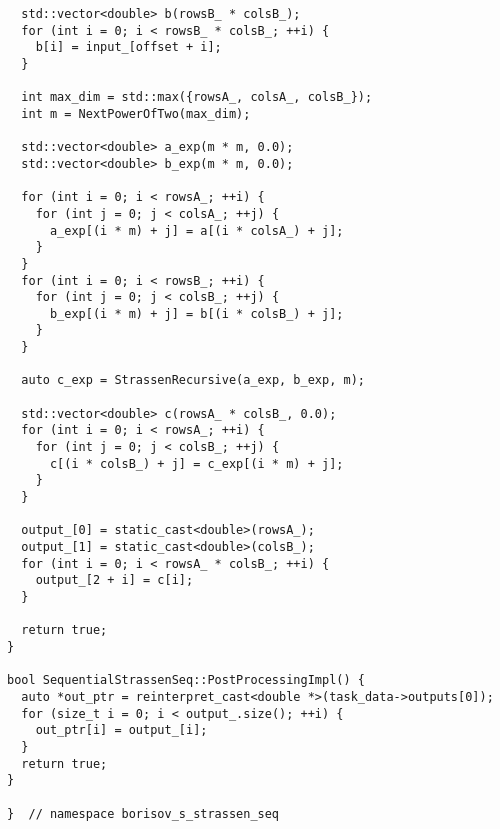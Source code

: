\documentclass[12pt]{article}
\begin{document}
\begin{lstlisting}
  std::vector<double> b(rowsB_ * colsB_);
  for (int i = 0; i < rowsB_ * colsB_; ++i) {
    b[i] = input_[offset + i];
  }

  int max_dim = std::max({rowsA_, colsA_, colsB_});
  int m = NextPowerOfTwo(max_dim);

  std::vector<double> a_exp(m * m, 0.0);
  std::vector<double> b_exp(m * m, 0.0);

  for (int i = 0; i < rowsA_; ++i) {
    for (int j = 0; j < colsA_; ++j) {
      a_exp[(i * m) + j] = a[(i * colsA_) + j];
    }
  }
  for (int i = 0; i < rowsB_; ++i) {
    for (int j = 0; j < colsB_; ++j) {
      b_exp[(i * m) + j] = b[(i * colsB_) + j];
    }
  }

  auto c_exp = StrassenRecursive(a_exp, b_exp, m);

  std::vector<double> c(rowsA_ * colsB_, 0.0);
  for (int i = 0; i < rowsA_; ++i) {
    for (int j = 0; j < colsB_; ++j) {
      c[(i * colsB_) + j] = c_exp[(i * m) + j];
    }
  }

  output_[0] = static_cast<double>(rowsA_);
  output_[1] = static_cast<double>(colsB_);
  for (int i = 0; i < rowsA_ * colsB_; ++i) {
    output_[2 + i] = c[i];
  }

  return true;
}

bool SequentialStrassenSeq::PostProcessingImpl() {
  auto *out_ptr = reinterpret_cast<double *>(task_data->outputs[0]);
  for (size_t i = 0; i < output_.size(); ++i) {
    out_ptr[i] = output_[i];
  }
  return true;
}

}  // namespace borisov_s_strassen_seq
\end{lstlisting}
\end{document}
